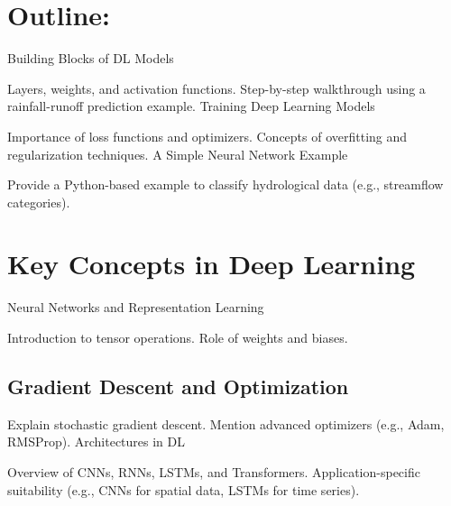 


\section{Outline:}  
Building Blocks of DL Models

Layers, weights, and activation functions.
Step-by-step walkthrough using a rainfall-runoff prediction example.
Training Deep Learning Models

Importance of loss functions and optimizers.
Concepts of overfitting and regularization techniques.
A Simple Neural Network Example

Provide a Python-based example to classify hydrological data (e.g., streamflow categories).

\section{Key Concepts in Deep Learning}
Neural Networks and Representation Learning

Introduction to tensor operations.
Role of weights and biases.
\subsection{Gradient Descent and Optimization}

Explain stochastic gradient descent.
Mention advanced optimizers (e.g., Adam, RMSProp).
Architectures in DL

Overview of CNNs, RNNs, LSTMs, and Transformers.
Application-specific suitability (e.g., CNNs for spatial data, LSTMs for time series).

